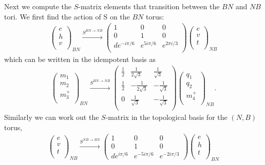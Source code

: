 Next we compute the $S$-matrix elements that transition between the $BN$ and $NB$ tori.
We first find the action of S on the $BN$ torus:
\begin{align}
\left( \begin{matrix}
e\\
h\\
v\\
\end{matrix} \right)_{BN} 
 \xrightarrow{S^{BN\rightarrow NB}}
\left( \begin{matrix}
1&0&0\\
0&1&0\\
d e^{-i \pi/6} & e^{5 i \pi/6}  & e^{2 \pi i /3}\\
\end{matrix} \right)
\left( \begin{matrix}
e\\
v\\
t\\
\end{matrix} \right)_{NB}
\end{align}
which can be written in the idempotent basis as
\begin{align}\left( \begin{matrix}
{m}_1\\
{m}_2\\
m_3^+\\
\end{matrix} \right)_{BN}
\xrightarrow{S^{BN \rightarrow NB}}
\left( \begin{matrix}
\frac{1}{2} & \frac{1}{2 \sqrt{3}} &  \frac{1}{\sqrt{3}} \\
\frac{1}{2} & - \frac{1}{2\sqrt{3}} & -\frac{1}{\sqrt{3}} \\
0& \frac{1}{\sqrt{3}} & -\frac{1}{\sqrt{3}} \\
\end{matrix} \right)
\left( \begin{matrix}
{q}_1\\
{q}_2\\
m_4^+\\
\end{matrix} \right)_{NB}.
\end{align}
Similarly we can work out the $S$-matrix in the topological basis for the $(N,B)$ torus,
\begin{align}
\left( \begin{matrix}
e \\ 
v\\ 
t\\ 
\end{matrix} \right)_{NB}
  \xrightarrow{S^{NB \rightarrow BN}}
\left( \begin{matrix}
1&0&0\\
0&1&0\\
de^{i \pi/6} & e^{-5 i \pi /6} & e^{-2 i \pi /3}
\end{matrix} \right)
\left( \begin{matrix}
e \\
h\\ 
t\\ 
\end{matrix} \right)_{BN} 
\end{align}
